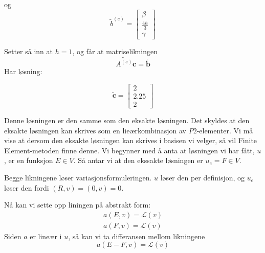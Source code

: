 \documentclass[a4paper, 10pt]{article}
\newcommand{\mb}{\mathbf}
\newcommand{\mc}{\mathcal}
\begin{document}
og
\begin{equation}
\tilde b^{(e)} =
\left\lbrack
\begin{array}{c}
\beta \\
\frac{4h}{3} \\
\gamma
\end{array}
\right\rbrack
\end{equation}

Setter så inn at $h=1$, og får at matriselikningen
\begin{equation}
	\tilde{A^{(e)}} \mb{c} = \tilde{\mb{b}}
	\end{equation}
Har løsning:

\begin{equation}
\tilde{\mb{c}}=
\left\lbrack
\begin{array}{c}
2 \\
2.25 \\
2
\end{array}
\right\rbrack
\end{equation}

Denne løsningen er den samme som den eksakte løsningen. Det skyldes at den eksakte løsningen kan skrives som en lieærkombinasjon av $P2$-elementer. Vi må vise at dersom den eksakte løsningen kan skrives i basisen vi velger, så vil Finite Element-metoden finne denne. 
Vi begynner med å anta at løsningen vi har fått, $u$, er en funksjon $E \in V$. Så antar vi at den ekssakte løsningen er $u_e = F \in V$.

Begge likningene løser variasjonsformuleringen. $u$ løser den per definisjon, og $u_e$ løser den fordi $(R, v) = (0, v) = 0$. 

Nå kan vi sette opp liningen på abstrakt form:
\begin{align}
	a(E, v) = \mc{L}(v) \\
	a(F, v) = \mc{L}(v)
\end{align}
Siden $a$ er lineær i $u$, så kan vi ta differansen mellom likningene
\begin{equation}
	a(E-F, v) = \mc{L}(v) 
\end{equation}
\end{document}
